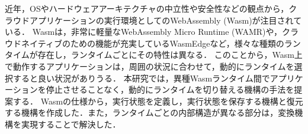 近年，OSやハードウェアアーキテクチャの中立性や安全性などの観点から，クラウドアプリケーションの実行環境としてのWebAssembly (Wasm)が注目されている．
Wasmは，非常に軽量なWebAssembly Micro Runtime (WAMR)や，クラウドネイティブのための機能が充実しているWasmEdgeなど，様々な種類のランタイムが存在し，ランタイムごとにその特性は異なる．
このことから，Wasm上で動作するアプリケーションは，周囲の状況に合わせて，動的にランタイムを選択すると良い状況がありうる．
本研究では，異種Wasmランタイム間でアプリケーションを停止させることなく，動的にランタイムを切り替える機構の手法を提案する．
Wasmの仕様から，実行状態を定義し，実行状態を保存する機構と復元する機構を作成した．また，ランタイムごとの内部構造が異なる部分は，変換機構を実現することで解決した．